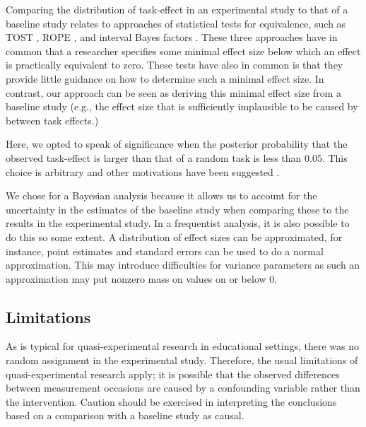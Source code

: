 \documentclass[a4paper]{article}
\begin{document}
Comparing the distribution of task-effect in an experimental study to that of a baseline study relates to approaches of statistical tests for equivalence, such as TOST \cite{lakens2017equivalence}, ROPE \cite{kruschke2011bayesian}, and interval Bayes factors \cite{MoreyRouder2011}.
These three approaches have in common that a researcher specifies some minimal effect size below which an effect is practically equivalent to zero.
These tests have also in common is that they provide little guidance on how to determine such a minimal effect size.
In contrast, our approach can be seen as deriving this minimal effect size from a baseline study (e.g., the effect size that is sufficiently implausible to be caused by between task effects.)

Here, we opted to speak of significance when the posterior probability that the observed task-effect is larger than that of a random task is less than $0.05$. This choice is arbitrary and other motivations have been suggested \cite{McShane2017abandon, BenjaminEtAl2018}.

We chose for a Bayesian analysis because it allows us to account for the uncertainty in the estimates of the baseline study when comparing these to the results in the experimental study. In a frequentist analysis, it is also possible to do this so some extent. A distribution of effect sizes can be approximated, for instance, point estimates and standard errors can be used to do a normal approximation. This may introduce difficulties for variance parameters as such an approximation may put nonzero mass on values on or below 0.


\subsection*{Limitations}
As is typical for quasi-experimental research in educational settings, there was no random assignment in the experimental study.
Therefore, the usual limitations of quasi-experimental research apply; it is possible that the observed differences between measurement occasions are caused by a confounding variable rather than the intervention.
Caution should be exercised in interpreting the conclusions based on a comparison with a baseline study as causal.
\end{document}
